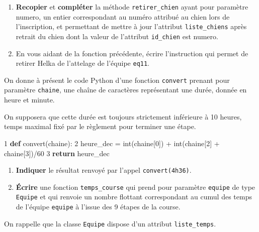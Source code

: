 \documentclass[
  paper=a4,
  ,captions=tableheading
]{scrartcl}
\newenvironment{Shaded}{}{}
\newcommand{\BuiltInTok}[1]{\textcolor[rgb]{0.00,0.50,0.00}{#1}}
\newcommand{\ControlFlowTok}[1]{\textcolor[rgb]{0.00,0.44,0.13}{\textbf{#1}}}
\newcommand{\DecValTok}[1]{\textcolor[rgb]{0.25,0.63,0.44}{#1}}
\newcommand{\KeywordTok}[1]{\textcolor[rgb]{0.00,0.44,0.13}{\textbf{#1}}}
\newcommand{\NormalTok}[1]{#1}
\newcommand{\OperatorTok}[1]{\textcolor[rgb]{0.40,0.40,0.40}{#1}}
\providecommand{\tightlist}{%
  \setlength{\itemsep}{0pt}\setlength{\parskip}{0pt}}
\begin{document}
\begin{enumerate}
\def\labelenumi{\arabic{enumi}.}
\setcounter{enumi}{3}
\item
  \textbf{Recopier} et \textbf{compléter} la méthode
  \texttt{retirer\_chien} ayant pour paramètre numero, un entier
  correspondant au numéro attribué au chien lors de l'inscription, et
  permettant de mettre à jour l'attribut \texttt{liste\_chiens} après
  retrait du chien dont la valeur de l'attribut \texttt{id\_chien} est
  numero.
\item
  En vous aidant de la fonction précédente, écrire l'instruction qui
  permet de retirer Helka de l'attelage de l'équipe \texttt{eq11}.
\end{enumerate}

On donne à présent le code Python d'une fonction \texttt{convert}
prenant pour paramètre \texttt{chaine}, une chaîne de caractères
représentant une durée, donnée en heure et minute.

On supposera que cette durée est toujours strictement inférieure à 10
heures, temps maximal fixé par le règlement pour terminer une étape.

\begin{Shaded}
\begin{Highlighting}[]
\DecValTok{1} \KeywordTok{def}\NormalTok{ convert(chaine):}
\DecValTok{2}\NormalTok{       heure\_dec }\OperatorTok{=} \BuiltInTok{int}\NormalTok{(chaine[}\DecValTok{0}\NormalTok{]) }\OperatorTok{+} \BuiltInTok{int}\NormalTok{(chaine[}\DecValTok{2}\NormalTok{] }\OperatorTok{+}\NormalTok{ chaine[}\DecValTok{3}\NormalTok{])}\OperatorTok{/}\DecValTok{60}
\DecValTok{3}       \ControlFlowTok{return}\NormalTok{ heure\_dec}
\end{Highlighting}
\end{Shaded}

\begin{enumerate}
\def\labelenumi{\arabic{enumi}.}
\setcounter{enumi}{5}
\tightlist
\item
  \textbf{Indiquer} le résultat renvoyé par l'appel
  \texttt{convert(\textquotesingle{}4h36\textquotesingle{})}.
\item
  \textbf{Écrire} une fonction \texttt{temps\_course} qui prend pour
  paramètre \texttt{equipe} de type \texttt{Equipe} et qui renvoie un
  nombre flottant correspondant au cumul des temps de l'équipe
  \texttt{equipe} à l'issue des 9 étapes de la course.
\end{enumerate}

On rappelle que la classe \texttt{Equipe} dispose d'un attribut
\texttt{liste\_temps}.
\end{document}
